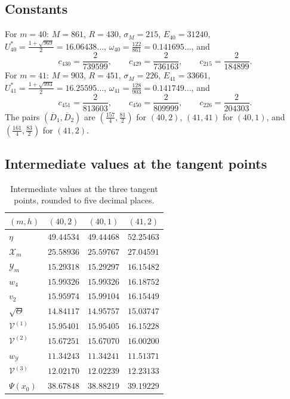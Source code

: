 \documentclass[11pt]{article}
\theoremstyle{definition}
\theoremstyle{remark}
\numberwithin{equation}{section}
\newcommand{\cV}{\mathcal V}
\newcommand{\cX}{\mathcal X}
\newcommand{\cY}{\mathcal Y}
\newcommand{\Db}{\overline D}
\begin{document}
\subsection*{Constants}

For $m=40$: $M=861$, $R=430$, $\sigma_M=215$, $E_{40}=31240$,
$U_{40}^*=\frac{1+\sqrt{969}}2=16.06438\ldots$,
$\omega_{40}=\frac{122}{861}=0.141695\ldots$, and
\[
  c_{430}=\frac{2}{739599},\qquad
  c_{429}=\frac{2}{736163},\qquad
  c_{215}=\frac{2}{184899}.
\]
For $m=41$: $M=903$, $R=451$, $\sigma_M=226$, $E_{41}=33661$,
$U_{41}^*=\frac{1+\sqrt{993}}2=16.25595\ldots$,
$\omega_{41}=\frac{128}{903}=0.141749\ldots$, and
\[
  c_{451}=\frac{2}{813603},\qquad
  c_{450}=\frac{2}{809999},\qquad
  c_{226}=\frac{2}{204303}.
\]
The pairs $(\Db_1,\Db_2)$ are $(\frac{157}4,\frac{81}2)$ for $(40,2)$,
$(41,41)$ for $(40,1)$, and $(\frac{161}4,\frac{83}2)$ for $(41,2)$.

\subsection*{Intermediate values at the tangent points}

\begin{table}[ht]
\centering
\caption{Intermediate values at the three tangent points, rounded to five
decimal places.}\label{tab:app-values}
\begin{tabular}{lccc}
\toprule
$(m,h)$ & $(40,2)$ & $(40,1)$ & $(41,2)$\\
\midrule
$\eta$        & $49.44534$ & $49.44468$ & $52.25463$\\
$\cX_m$         & $25.58936$ & $25.59767$ & $27.04591$\\
$\cY_m$         & $15.29318$ & $15.29297$ & $16.15482$\\
$w_4$         & $15.99326$ & $15.99326$ & $16.18752$\\
$v_2$         & $15.95974$ & $15.99104$ & $16.15449$\\
$\sqrt\Theta$ & $14.84117$ & $14.95757$ & $15.03747$\\
$\cV^{(1)}$         & $15.95401$ & $15.95405$ & $16.15228$\\
$\cV^{(2)}$         & $15.67251$ & $15.67070$ & $16.00200$\\
$w_{\cY}$         & $11.34243$ & $11.34241$ & $11.51371$\\
$\cV^{(3)}$           & $12.02170$ & $12.02239$ & $12.23133$\\
$\Psi(x_0)$   & $38.67848$ & $38.88219$ & $39.19229$\\
\bottomrule
\end{tabular}
\end{table}
\end{document}
